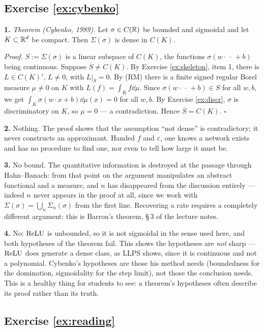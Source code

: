 \documentclass[11pt,a4paper]{article}
\begin{document}
\subsection*{Exercise \ref{ex:cybenko}}

\textbf{1.} \emph{Theorem (Cybenko, 1989).} Let $\sigma\in C(\mathbb{R})$ be bounded and sigmoidal and let
$K\subset\mathbb{R}^d$ be compact. Then $\Sigma(\sigma)$ is dense in $C(K)$.

\emph{Proof.} $S := \Sigma(\sigma)$ is a linear subspace of $C(K)$, the functions
$\sigma(w\cdot{\,\cdot\,}+b)$ being continuous. Suppose $\overline S\ne C(K)$. By Exercise
\ref{ex:skeleton}, item 1, there is $L\in C(K)'$, $L\ne0$, with $L|_{\overline S} = 0$. By (RM)
there is a finite signed regular Borel measure $\mu\ne0$ on $K$ with $L(f) = \int_K f\dd\mu$. Since
$\sigma(w\cdot{\,\cdot\,}+b)\in S$ for all $w,b$, we get $\int_K\sigma(w\cdot x+b)\dd\mu(x) = 0$ for
all $w,b$. By Exercise \ref{ex:discr}, $\sigma$ is discriminatory on $K$, so $\mu = 0$ --- a
contradiction. Hence $\overline S = C(K)$. $\square$

\textbf{2.} Nothing. The proof shows that the assumption ``not dense'' is contradictory; it never
constructs an approximant. Handed $f$ and $\varepsilon$, one knows a network exists and has no
procedure to find one, nor even to tell how large it must be.

\textbf{3.} No bound. The quantitative information is destroyed at the passage through Hahn--Banach:
from that point on the argument manipulates an abstract functional and a measure, and $n$ has
disappeared from the discussion entirely --- indeed $n$ never appears in the proof at all, since we
work with $\Sigma(\sigma) = \bigcup_n\Sigma_n(\sigma)$ from the first line. Recovering a rate
requires a completely different argument: this is Barron's theorem, §\,3 of the lecture notes.

\textbf{4.} No: $\operatorname{ReLU}$ is unbounded, so it is not sigmoidal in the sense used here, and both
hypotheses of the theorem fail. This shows the hypotheses are \emph{not} sharp --- $\operatorname{ReLU}$ does
generate a dense class, as LLPS shows, since it is continuous and not a polynomial. Cybenko's
hypotheses are those his method needs (boundedness for the domination, sigmoidality for the step
limit), not those the conclusion needs. This is a healthy thing for students to see: a theorem's
hypotheses often describe its proof rather than its truth.

\subsection*{Exercise \ref{ex:reading}}
\end{document}
